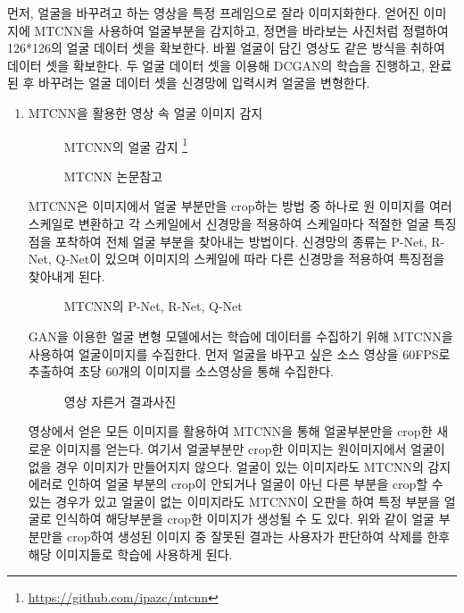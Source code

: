 먼저, 얼굴을 바꾸려고 하는 영상을 특정 프레임으로 잘라 이미지화한다. 얻어진 이미지에 MTCNN을 사용하여 얼굴부분을 감지하고,  정면을 바라보는 사진처럼 정렬하여 126*126의 얼굴 데이터 셋을 확보한다. 바뀔 얼굴이 담긴 영상도 같은 방식을 취하여 데이터 셋을 확보한다. 두 얼굴 데이터 셋을 이용해 DCGAN의 학습을 진행하고, 완료된 후 바꾸려는 얼굴 데이터 셋을 신경망에 입력시켜 얼굴을 변형한다.
\begin{enumerate}
    
    \item MTCNN을 활용한 영상 속 얼굴 이미지 감지


    \begin{figure}[h!]
    \centering
    \caption{MTCNN의 얼굴 감지 \protect\footnote{\protect\url {https://github.com/ipazc/mtcnn}}}
    \end{figure}

    \begin{figure}[h!]
    \centering
    \caption{MTCNN 논문참고}
    \end{figure}



    MTCNN은 이미지에서 얼굴 부분만을 crop하는 방법 중 하나로 원 이미지를 여러 스케일로 변환하고 각 스케일에서 신경망을 적용하여 스케일마다 적절한 얼굴 특징점을 포착하여 전체 얼굴 부분을 찾아내는 방법이다. 신경망의 종류는 P-Net, R-Net, Q-Net이 있으며 이미지의 스케일에 따라 다른 신경망을 적용하여 특징점을 찾아내게 된다.

    \begin{figure}[h!]
    \centering
    \caption{MTCNN의 P-Net, R-Net, Q-Net}
    \end{figure}


    GAN을 이용한 얼굴 변형 모델에서는 학습에 데이터를 수집하기 위해 MTCNN을 사용하여 얼굴이미지를 수집한다. 먼저 얼굴을 바꾸고 싶은 소스 영상을 60FPS로 추출하여 초당 60개의 이미지를 소스영상을 통해 수집한다.

    \begin{figure}[h!]%
    \centering
    \caption{영상 자른거 결과사진}
    \end{figure}


    영상에서 얻은 모든 이미지를 활용하여 MTCNN을 통해 얼굴부분만을 crop한 새로운 이미지를 얻는다. 여기서 얼굴부분만 crop한 이미지는 원이미지에서 얼굴이 없을 경우 이미지가 만들어지지 않으다. 얼굴이 있는 이미지라도 MTCNN의 감지 에러로 인하여 얼굴 부분의 crop이 안되거나 얼굴이 아닌 다른 부분을 crop할 수 있는 경우가 있고 얼굴이 없는 이미지라도 MTCNN이 오판을 하여 특정 부분을 얼굴로 인식하여 해당부분을 crop한 이미지가 생성될 수 도 있다. 위와 같이 얼굴 부분만을 crop하여 생성된 이미지 중 잘못된 결과는 사용자가 판단하여 삭제를 한후 해당 이미지들로 학습에 사용하게 된다.


\end{enumerate}
